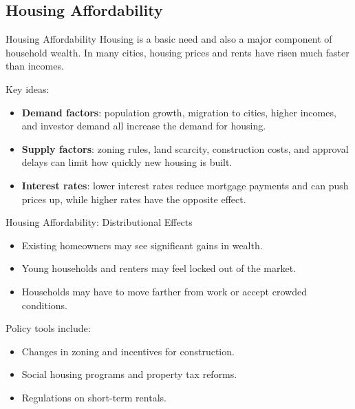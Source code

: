 \documentclass[aspectratio=169]{beamer}
\begin{document}
\subsection{Housing Affordability}

\begin{frame}{Housing Affordability}
  \transfade
  Housing is a basic need and also a major component of household wealth. In many cities,
  housing prices and rents have risen much faster than incomes.

  \vspace{0.2cm}
  Key ideas:
  \begin{itemize}[<+->]
    \item \textbf{Demand factors}: population growth, migration to cities, higher incomes, and investor
    demand all increase the demand for housing.
    \item \textbf{Supply factors}: zoning rules, land scarcity, construction costs, and approval delays
    can limit how quickly new housing is built.
    \item \textbf{Interest rates}: lower interest rates reduce mortgage payments and can push prices
    up, while higher rates have the opposite effect.
  \end{itemize}
\end{frame}

\begin{frame}{Housing Affordability: Distributional Effects}
  \transfade
  \begin{itemize}[<+->]
    \item Existing homeowners may see significant gains in wealth.
    \item Young households and renters may feel locked out of the market.
    \item Households may have to move farther from work or accept crowded conditions.
  \end{itemize}

  \vspace{0.3cm}
  Policy tools include:
  \begin{itemize}[<+->]
    \item Changes in zoning and incentives for construction.
    \item Social housing programs and property tax reforms.
    \item Regulations on short-term rentals.
  \end{itemize}
\end{frame}
\end{document}

